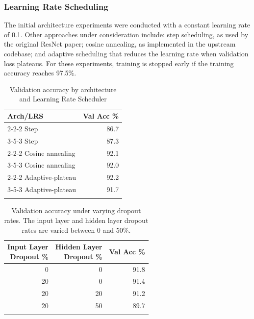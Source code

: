 \documentclass[letterpaper]{article} %
\begin{document}
\subsubsection{Learning Rate Scheduling}

The initial architecture experiments were conducted with a constant learning rate of 0.1.
Other approaches under consideration include: step scheduling, as used by the original ResNet paper;
cosine annealing, as implemented in the upstream codebase;
and adaptive scheduling that reduces the learning rate when validation loss plateaus.
For these experiments, training is stopped early if the training accuracy reaches 97.5\%.

\begin{table}[b]
\centering
\begin{tabular}{|l|r|}
    \firsthline
    Arch/LRS & Val Acc \%    \\
    \hline
    2-2-2 Step & 86.7    \\
    3-5-3 Step & 87.3    \\
    2-2-2 Cosine annealing & 92.1    \\
    3-5-3 Cosine annealing & 92.0    \\
    2-2-2 Adaptive-plateau & 92.2    \\
    3-5-3 Adaptive-plateau & 91.7    \\
    \lasthline
\end{tabular}
\caption{Validation accuracy by architecture and Learning Rate Scheduler}
\label{table2}
\end{table}

\begin{table}[b]
\centering
\begin{tabular}{|r|r|r|}
    \firsthline
    \makecell{Input Layer \\ Dropout \% }  & \makecell{Hidden Layer \\ Dropout \% } & Val Acc \%    \\
    \hline
    0 & 0 & 91.8    \\
    20 & 0 & 91.4    \\
    20 & 20 & 91.2    \\
    20 & 50 & 89.7    \\
    \lasthline
\end{tabular}
\caption{Validation accuracy under varying dropout rates. The input layer and hidden layer dropout rates are varied between 0 and 50\%.}
\label{table3}
\end{table}
\end{document}
